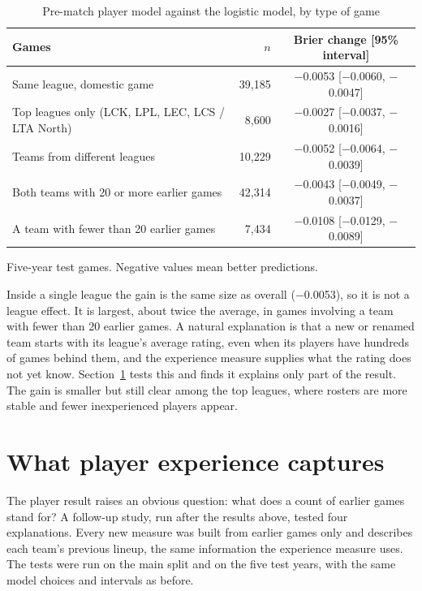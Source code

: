 \documentclass[12pt,a4paper]{article}
\begin{document}
\begin{table}[H]
\centering\small
\begin{threeparttable}
\caption{Pre-match player model against the logistic model, by type of game}\label{tab:sub}
\begin{tabular}{@{}lrc@{}}
\toprule
Games & $n$ & Brier change [95\% interval] \\
\midrule
Same league, domestic game & 39,185 & $-$0.0053 [$-$0.0060, $-$0.0047] \\
Top leagues only (LCK, LPL, LEC, LCS / LTA North) & 8,600 & $-$0.0027 [$-$0.0037, $-$0.0016] \\
Teams from different leagues & 10,229 & $-$0.0052 [$-$0.0064, $-$0.0039] \\
Both teams with 20 or more earlier games & 42,314 & $-$0.0043 [$-$0.0049, $-$0.0037] \\
A team with fewer than 20 earlier games & 7,434 & $-$0.0108 [$-$0.0129, $-$0.0089] \\
\bottomrule
\end{tabular}
\begin{tablenotes}\footnotesize
\item Five-year test games. Negative values mean better predictions.
\end{tablenotes}
\end{threeparttable}
\end{table}

Inside a single league the gain is the same size as overall ($-$0.0053), so it is not a league effect. It is largest, about twice the average, in games involving a team with fewer than 20 earlier games. A natural explanation is that a new or renamed team starts with its league's average rating, even when its players have hundreds of games behind them, and the experience measure supplies what the rating does not yet know. Section~\ref{sec:mech} tests this and finds it explains only part of the result. The gain is smaller but still clear among the top leagues, where rosters are more stable and fewer inexperienced players appear.

\section{What player experience captures}\label{sec:mech}

The player result raises an obvious question: what does a count of earlier games stand for? A follow-up study, run after the results above, tested four explanations. Every new measure was built from earlier games only and describes each team's previous lineup, the same information the experience measure uses. The tests were run on the main split and on the five test years, with the same model choices and intervals as before.
\end{document}
